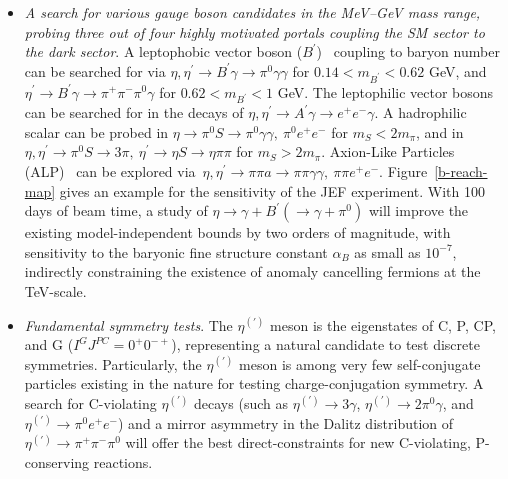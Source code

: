 \begin{itemize}
\item {\em A search for various gauge boson candidates in the MeV--GeV
  mass range, probing three out of four highly motivated portals
  coupling the SM sector to the dark sector}. A leptophobic vector
  boson ($B^\prime$)~\cite{Tulin:2014} coupling to baryon number can
  be searched for via $\eta, \eta^\prime \rightarrow B^\prime
  \gamma\rightarrow \pi^0\gamma\gamma$ for $0.14< m_{B^\prime} < 0.62$
  GeV, and $\eta^\prime \rightarrow B^\prime \gamma\rightarrow
  \pi^+\pi^-\pi^0\gamma$ for $0.62 < m_{B^\prime}< 1$ GeV.  The
  leptophilic vector
  bosons~\cite{Fayet:2007ua,Reece:2009un,Bjorken:2009mm,Batell:2009yf}
  can be searched for in the decays of $\eta, \eta^\prime \rightarrow
  A^\prime \gamma\rightarrow e^+e^-\gamma$.  A
  hadrophilic~\cite{Batell:2018fqo,Liu:2019} scalar can be probed in
  $\eta\to \pi^0 S \to \pi^0 \gamma \gamma , \: \pi^0 e^+ e^-$ for
  $m_S < 2m_\pi$, and in $\eta, \eta^\prime \to \pi^0 S \to 3\pi , \:
  \eta^\prime \to \eta S \to \eta\pi\pi$ for $m_S >
  2m_\pi$. Axion-Like Particles (ALP)~\cite{
    Dobrescu:2000jt,Aloni:2018vki,Nomura:2008ru,Freytsis:2010ne} can
  be explored via~$ \eta, \eta^\prime \to \pi\pi a \to \pi\pi
  \gamma\gamma , \: \pi\pi e^+ e^-$.  Figure~\ref{b-reach-map} gives an
  example for the sensitivity of the JEF experiment. With 100 days of
  beam time, a study of $\eta \to \gamma + B^\prime (\to \gamma +
  \pi^0)$ will improve the existing model-independent bounds by two
  orders of magnitude, with sensitivity to the baryonic fine structure
  constant $\alpha_B$ as small as $10^{-7}$, indirectly constraining
  the existence of anomaly cancelling fermions at the TeV-scale.

\item {\em Fundamental symmetry tests}.  The $\eta^{(\prime)}$ meson
  is the eigenstates of C, P, CP, and G ($I^GJ^{PC} = 0^+0^{-+}$),
  representing a natural candidate to test discrete symmetries.
  Particularly, the $\eta^{(\prime)}$ meson is among very few
  self-conjugate particles existing in the nature for testing
  charge-conjugation symmetry. A search for C-violating
  $\eta^{(\prime)}$ decays (such as $\eta^{(\prime)} \to 3\gamma$,
  $\eta^{(\prime)} \to 2\pi^0 \gamma$, and $\eta^{(\prime)} \to \pi^0
  e^+ e^-$) and a mirror asymmetry in the Dalitz distribution of
  $\eta^{(\prime)} \to \pi^+\pi^-\pi^0$ will offer the best
  direct-constraints for new C-violating, P-conserving reactions.


\end{itemize}

